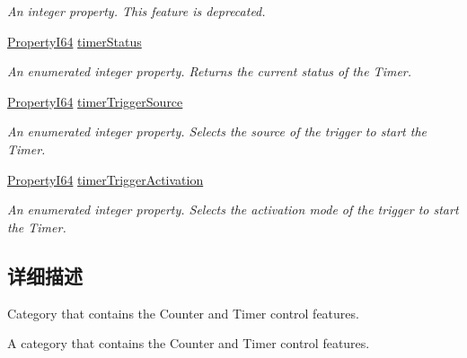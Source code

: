 \begin{DoxyCompactItemize}
\begin{DoxyCompactList}\small\item\em An integer property. This feature is deprecated. \end{DoxyCompactList}\item 
\hyperlink{group___common_interface_ga81749b2696755513663492664a18a893}{Property\+I64} \hyperlink{classmv_i_m_p_a_c_t_1_1acquire_1_1_gen_i_cam_1_1_counter_and_timer_control_a119e611c5ad880862fd3194de9f63c61}{timer\+Status}
\begin{DoxyCompactList}\small\item\em An enumerated integer property. Returns the current status of the Timer. \end{DoxyCompactList}\item 
\hyperlink{group___common_interface_ga81749b2696755513663492664a18a893}{Property\+I64} \hyperlink{classmv_i_m_p_a_c_t_1_1acquire_1_1_gen_i_cam_1_1_counter_and_timer_control_ace2a27d5ef880f1590cca9313ec84684}{timer\+Trigger\+Source}
\begin{DoxyCompactList}\small\item\em An enumerated integer property. Selects the source of the trigger to start the Timer. \end{DoxyCompactList}\item 
\hyperlink{group___common_interface_ga81749b2696755513663492664a18a893}{Property\+I64} \hyperlink{classmv_i_m_p_a_c_t_1_1acquire_1_1_gen_i_cam_1_1_counter_and_timer_control_aafe9deefca2b00ca24218d2763082720}{timer\+Trigger\+Activation}
\begin{DoxyCompactList}\small\item\em An enumerated integer property. Selects the activation mode of the trigger to start the Timer. \end{DoxyCompactList}\end{DoxyCompactItemize}


\subsection{详细描述}
Category that contains the Counter and Timer control features. 

A category that contains the Counter and Timer control features. 

